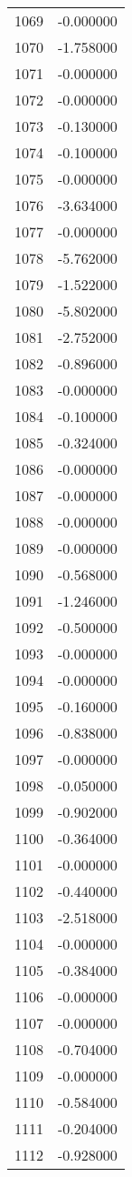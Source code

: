 \documentclass[12pt]{article}
\begin{document}
\begin{longtable}{@{}cc@{}}
1069 & -0.000000 \\
1070 & -1.758000 \\
1071 & -0.000000 \\
1072 & -0.000000 \\
1073 & -0.130000 \\
1074 & -0.100000 \\
1075 & -0.000000 \\
1076 & -3.634000 \\
1077 & -0.000000 \\
1078 & -5.762000 \\
1079 & -1.522000 \\
1080 & -5.802000 \\
1081 & -2.752000 \\
1082 & -0.896000 \\
1083 & -0.000000 \\
1084 & -0.100000 \\
1085 & -0.324000 \\
1086 & -0.000000 \\
1087 & -0.000000 \\
1088 & -0.000000 \\
1089 & -0.000000 \\
1090 & -0.568000 \\
1091 & -1.246000 \\
1092 & -0.500000 \\
1093 & -0.000000 \\
1094 & -0.000000 \\
1095 & -0.160000 \\
1096 & -0.838000 \\
1097 & -0.000000 \\
1098 & -0.050000 \\
1099 & -0.902000 \\
1100 & -0.364000 \\
1101 & -0.000000 \\
1102 & -0.440000 \\
1103 & -2.518000 \\
1104 & -0.000000 \\
1105 & -0.384000 \\
1106 & -0.000000 \\
1107 & -0.000000 \\
1108 & -0.704000 \\
1109 & -0.000000 \\
1110 & -0.584000 \\
1111 & -0.204000 \\
1112 & -0.928000 \\

\end{longtable}
\end{document}
